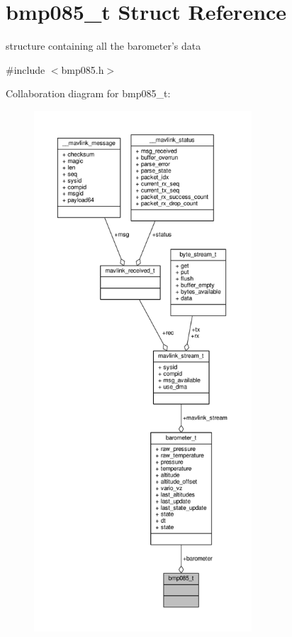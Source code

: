 \hypertarget{structbmp085__t}{\section{bmp085\+\_\+t Struct Reference}
\label{structbmp085__t}
}


structure containing all the barometer's data  




{\ttfamily \#include $<$bmp085.\+h$>$}



Collaboration diagram for bmp085\+\_\+t\+:
\nopagebreak
\begin{figure}[H]
\begin{center}
\leavevmode
\includegraphics[height=550pt]{structbmp085__t__coll__graph}
\end{center}
\end{figure}
